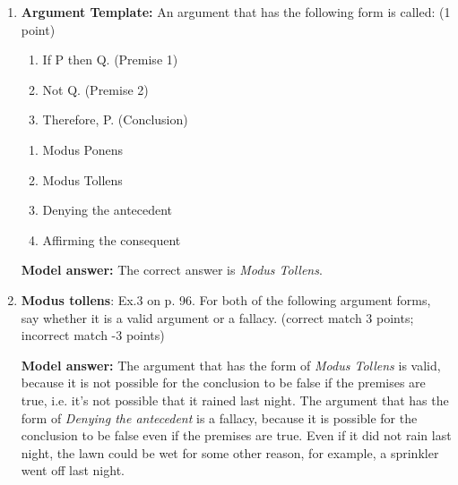 \documentclass[a4,11pt]{article}
\newcommand{\6}{\mbox{$[\hspace*{-.6mm}[$}}
\newcommand{\9}{\mbox{$]\hspace*{-.6mm}]$}}
\begin{document}
\begin{enumerate}[leftmargin = 12pt]
Propositional logic formulae:

\begin{enumerate}[noitemsep]
\item $K \wedge S$
\item $K \vee A$
\item $K \wedge \neg S$
\item $\neg K \wedge A$
\item $\neg (K \vee A)$
\end{enumerate}

{\bf Model answer:} The English sentences in (a) - (e) are translated by the Propositional logic formulae in (a) - (e), respectively (i.e., in the order given).


\item {\bf Argument Template:} An argument that has the following form is called: (1 point)

\begin{enumerate}[noitemsep]
\item[] If P then Q.  \hfill (Premise 1)
\item[] Not Q.  \hfill  (Premise 2)
\item[] Therefore, P. \hfill  (Conclusion)
\end{enumerate}

\begin{enumerate}[noitemsep]
\item Modus Ponens
\item Modus Tollens
\item Denying the antecedent
\item Affirming the consequent
\end{enumerate}

{\bf Model answer:} The correct answer is \textit{Modus Tollens}.

\item {\bf Modus tollens}: Ex.3 on p. 96. For both of the following argument forms, say whether it is a valid argument or a fallacy.  (correct match 3 points; incorrect match -3 points)

{\bf Model answer:} The argument that has the form of {\it Modus Tollens} is valid, because it is not possible for the conclusion to be false if the premises are true, i.e. it's not possible that it rained last night. The argument that has the form of {\it Denying the antecedent} is a fallacy, because it is possible for the conclusion to be false even if the premises are true. Even if it did not rain last night, the lawn could be wet for some other reason, for example, a sprinkler went off last night.



\end{enumerate}
\end{document}
